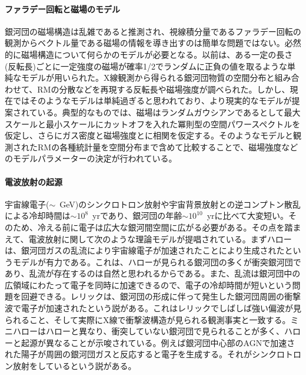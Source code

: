 \paragraph{ファラデー回転と磁場のモデル}

銀河団の磁場構造は乱雑であると推測され、視線積分量であるファラデー回転の観測からベクトル量である磁場の情報を導き出すのは簡単な問題ではない。必然的に磁場構造について何らかのモデルが必要となる。以前は、ある一定の長さ(反転長)ごとに一定強度の磁場が確率1/2でランダムに正負の値を取るような単純なモデルが用いられた。X線観測から得られる銀河団物質の空間分布と組み合わせて、RMの分散などを再現する反転長や磁場強度が調べられた\citep{1990ApJ...355...29K,1991ApJ...379...80K}。しかし、現在ではそのようなモデルは単純過ぎると思われており、より現実的なモデルが提案されている\citep{2003A&A...401..835E,2004A&A...424..429M}。典型的なものでは、磁場はランダムガウシアンであるとして最大スケールと最小スケールにカットオフを入れた冪則型の空間パワースペクトルを仮定し、さらにガス密度と磁場強度とに相関を仮定する。そのようなモデルと観測されたRMの各種統計量を空間分布まで含めて比較することで、磁場強度などのモデルパラメーターの決定が行われている\citep{2008A&A...483..699G}。

\paragraph{電波放射の起源}

宇宙線電子($\sim$~GeV)のシンクロトロン放射や宇宙背景放射との逆コンプトン散乱による冷却時間は$\sim 10^8$~yrであり、銀河団の年齢$\sim 10^{10}$~yrに比べて大変短い。そのため、冷える前に電子は広大な銀河間空間に広がる必要がある。その点を踏まえて、電波放射に関して次のような理論モデルが提唱されている。まずハローは、銀河団ガスの乱流により宇宙線電子が加速されたことにより生成されたというモデルが有力である\citep{2001MNRAS.320..365B,2002ApJ...577..658O,2003ApJ...584..190F}。これは、ハローが見られる銀河団の多くが衝突銀河団であり、乱流が存在するのは自然と思われるからである。また、乱流は銀河団中の広領域にわたって電子を同時に加速できるので、電子の冷却時間が短いという問題を回避できる。レリックは、銀河団の形成に伴って発生した銀河団周囲の衝撃波で電子が加速されたという説がある\citep{1998A&A...332..395E, 2001ApJ...563..660F}。これはレリックでしばしば強い偏波が見られること、そして実際にX線で衝撃波構造が見られる観測事実\citep{2013PASJ...65...16A}と一致する。ミニハローはハローと異なり、衝突していない銀河団で見られることが多く、ハローと起源が異なることが示唆されている。例えば銀河団中心部のAGNで加速された陽子が周囲の銀河団ガスと反応すると電子を生成する。それがシンクロトロン放射をしているという説がある\citep{2013MNRAS.428..599F}。

